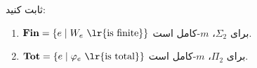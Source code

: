 ثابت کنید:
\begin{enumerate}
  \item $\mathbf{Fin} = \{ e \mid W_e ~ \text{\lr{is finite}} \}$ برای $\Sigma_2$، $m$-کامل است.
  \item $\mathbf{Tot} = \{ e \mid \varphi_e ~ \text{\lr{is total}} \}$ برای $\Pi_2$، $m$-کامل است.
\end{enumerate}